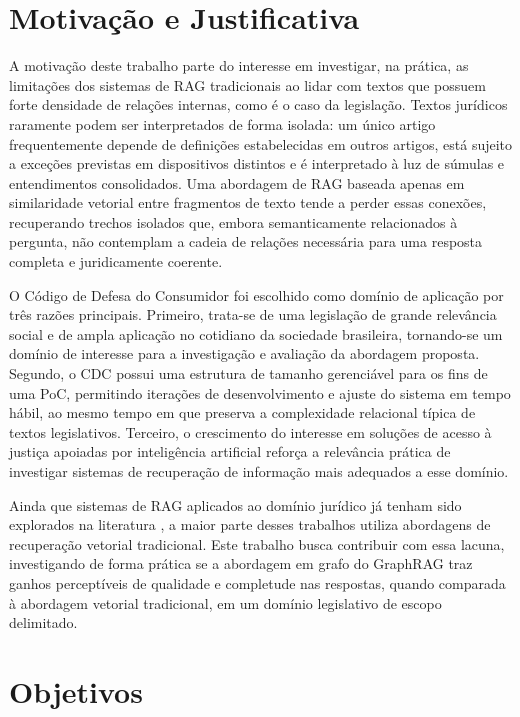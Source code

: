 \section{Motivação e Justificativa}
\label{sec-intro-motjus}

A motivação deste trabalho parte do interesse em investigar, na prática, as
limitações dos sistemas de RAG tradicionais ao lidar com textos que possuem
forte densidade de relações internas, como é o caso da legislação. Textos
jurídicos raramente podem ser interpretados de forma isolada: um único artigo
frequentemente depende de definições estabelecidas em outros artigos, está
sujeito a exceções previstas em dispositivos distintos e é interpretado à luz
de súmulas e entendimentos consolidados. Uma abordagem de RAG baseada apenas em
similaridade vetorial entre fragmentos de texto tende a perder essas conexões,
recuperando trechos isolados que, embora semanticamente relacionados à
pergunta, não contemplam a cadeia de relações necessária para uma resposta
completa e juridicamente coerente.

O Código de Defesa do Consumidor foi escolhido como domínio de aplicação por
três razões principais. Primeiro, trata-se de uma legislação de grande relevância 
social e de ampla aplicação no cotidiano da sociedade brasileira, tornando-se um domínio de interesse para a investigação e avaliação da abordagem proposta. Segundo, o CDC possui uma estrutura de
tamanho gerenciável para os fins de uma PoC, permitindo iterações de
desenvolvimento e ajuste do sistema em tempo hábil, ao mesmo tempo em que
preserva a complexidade relacional típica de textos legislativos. Terceiro, o crescimento do
interesse em soluções de acesso à justiça apoiadas por inteligência
artificial reforça a relevância prática de investigar sistemas de recuperação
de informação mais adequados a esse domínio.

Ainda que sistemas de RAG aplicados ao domínio jurídico já tenham sido
explorados na literatura \cite{cui2023chatlaw}, a maior parte desses trabalhos utiliza abordagens de
recuperação vetorial tradicional. Este trabalho busca
contribuir com essa lacuna, investigando de forma prática se a abordagem em
grafo do GraphRAG traz ganhos perceptíveis de qualidade e completude nas
respostas, quando comparada à abordagem vetorial tradicional, em um domínio
legislativo de escopo delimitado.

\section{Objetivos}
\label{sec-intro-obj}

